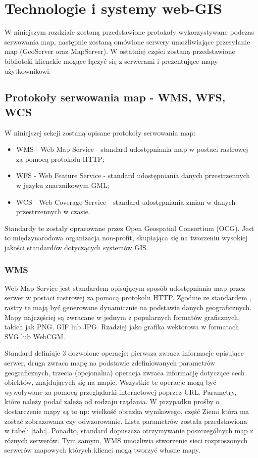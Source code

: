 \chapter{Technologie i systemy web-GIS}
W niniejszym rozdziale zostaną przedstawione protokoły wykorzystywane podczas serwowania map, następnie zostaną omówione serwery umożliwiające przesyłanie map (GeoServer oraz MapServer).
W ostatniej części zostaną przedstawione biblioteki klienckie mogące łączyć się z serwerami i prezentujące mapy użytkownikowi.

\section{Protokoły serwowania map - WMS, WFS, WCS}
W niniejszej sekcji zostaną opisane protokoły serwowania map:
\begin{itemize}
\item WMS - Web Map Service - standard udostępniania map w postaci rastrowej za pomocą protokołu HTTP;
\item WFS - Web Feature Service - standard udostępniania danych przestrzennych w języku znacznikowym GML;
\item WCS - Web Coverage Service - standard udostępniania zmian w danych przestrzennych w czasie.
\end{itemize}

Standardy te zostały opracowane przez Open Geospatial Consortium (OCG). Jest to międzynarodowa organizacja non-profit, skupiająca się na tworzeniu wysokiej jakości standardów dotyczących systemów GIS.

\subsection{WMS}
Web Map Service jest standardem opisującym sposób udostępniania map przez serwer w postaci rastrowej za pomocą protokołu HTTP.
Zgodnie ze standardem \cite{OpenGIS_WMS2006}, rastry te mają być generowane dynamicznie na podstawie danych geograficznych.
Mapy najczęściej są zwracane w jednym z popularnych formatów graficznych, takich jak PNG, GIF lub JPG. Rzadziej jako grafika wektorowa w formatach SVG lub WebCGM.

Standard definiuje 3 dozwolone operacje: pierwsza zwraca informacje opisujące serwer, druga zwraca mapę na podstawie zdefiniowanych parametrów geograficznych, trzecia (opcjonalna) operacja
zwraca informację dotyczące cech obiektów, znajdujących się na mapie. Wszystkie te operacje mogą być wywoływane za pomocą przeglądarki internetowej poprzez URL. Parametry, które należy
podać zależą od rodzaju rządania. W przypadku prośby o dostarczenie mapy są to np: wielkość obrazka wynikowego, część Ziemi która ma zostać zobrazowana czy odwzorowanie. Lista parametrów
została przedstawiona w tabeli \ref{tab:}. Ponadto, standard dopuszcza otrzymywanie poszczególnych map z różnych serwerów. Tym samym, WMS umożliwia stworzenie sieci rozproszonych serwerów
mapowych których klienci mogą tworzyć własne mapy.

